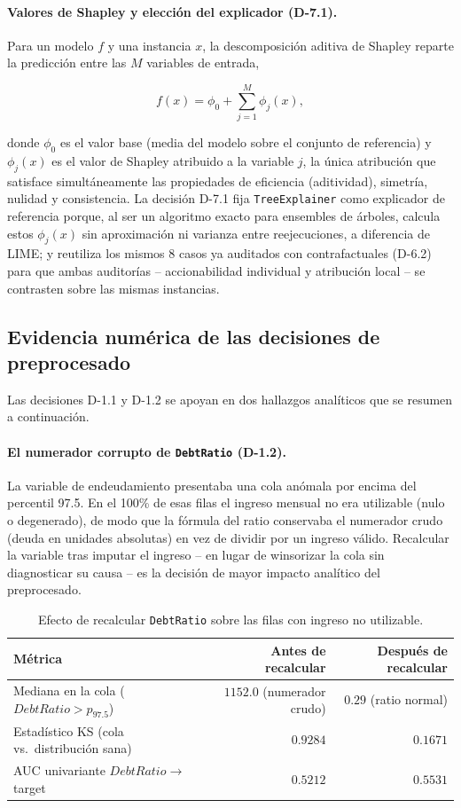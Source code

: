 \documentclass[11pt,a4paper]{article}
\begin{document}
\paragraph{Valores de Shapley y elección del explicador (D-7.1).} Para un modelo $f$ y una
instancia $x$, la descomposición aditiva de Shapley reparte la predicción entre las $M$ variables
de entrada,

\[
f(x) = \phi_0 + \sum_{j=1}^{M} \phi_j(x),
\]

donde $\phi_0$ es el valor base (media del modelo sobre el conjunto de referencia) y $\phi_j(x)$ es
el valor de Shapley atribuido a la variable $j$, la única atribución que satisface simultáneamente
las propiedades de eficiencia (aditividad), simetría, nulidad y consistencia. La decisión D-7.1 fija
\texttt{TreeExplainer} como explicador de referencia porque, al ser un algoritmo exacto para
ensembles de árboles, calcula estos $\phi_j(x)$ sin aproximación ni varianza entre reejecuciones, a
diferencia de LIME; y reutiliza los mismos 8 casos ya auditados con contrafactuales (D-6.2) para que
ambas auditorías -- accionabilidad individual y atribución local -- se contrasten sobre las mismas
instancias.

\subsection{Evidencia numérica de las decisiones de preprocesado}

Las decisiones D-1.1 y D-1.2 se apoyan en dos hallazgos analíticos que se resumen a continuación.

\paragraph{El numerador corrupto de \texttt{DebtRatio} (D-1.2).} La variable de endeudamiento
presentaba una cola anómala por encima del percentil 97.5. En el 100\% de esas filas el ingreso
mensual no era utilizable (nulo o degenerado), de modo que la fórmula del ratio conservaba el
numerador crudo (deuda en unidades absolutas) en vez de dividir por un ingreso válido. Recalcular la
variable tras imputar el ingreso -- en lugar de winsorizar la cola sin diagnosticar su causa -- es la
decisión de mayor impacto analítico del preprocesado.

\begin{table}[H]
\centering
\caption{Efecto de recalcular \texttt{DebtRatio} sobre las filas con ingreso no utilizable.}
\label{tab:debtratio}
\begin{tabular}{lrr}
\toprule
Métrica & Antes de recalcular & Después de recalcular \\
\midrule
Mediana en la cola ($\mathit{DebtRatio} > p_{97.5}$) & $1152.0$ (numerador crudo) & $0.29$ (ratio
normal) \\
Estadístico KS (cola vs.\ distribución sana) & $0.9284$ & $0.1671$ \\
AUC univariante $\mathit{DebtRatio} \rightarrow$ target & $0.5212$ & $0.5531$ \\
\bottomrule
\end{tabular}
\end{table}
\end{document}
